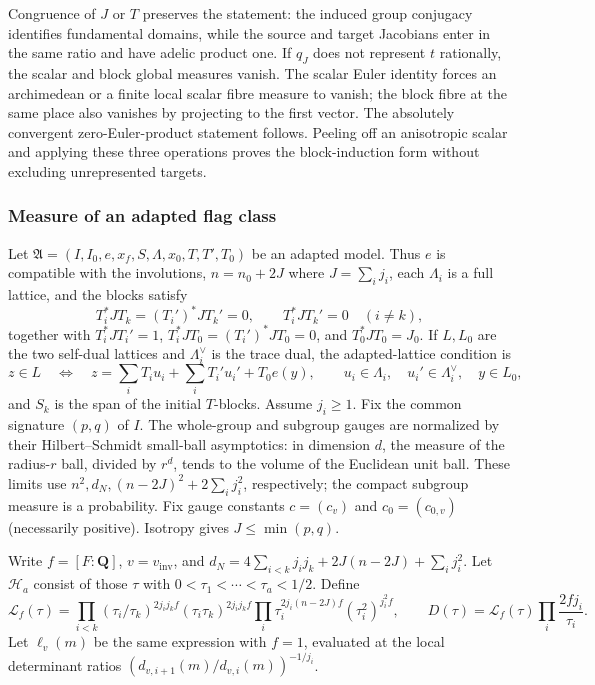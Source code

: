 Congruence of $J$ or $T$ preserves the statement: the induced group conjugacy identifies fundamental domains, while the source and target Jacobians enter in the same ratio and have adelic product one. If $q_J$ does not represent $t$ rationally, the scalar and block global measures vanish. The scalar Euler identity forces an archimedean or a finite local scalar fibre measure to vanish; the block fibre at the same place also vanishes by projecting to the first vector. The absolutely convergent zero-Euler-product statement follows. Peeling off an anisotropic scalar and applying these three operations proves the block-induction form without excluding unrepresented targets.

\subsubsection{Measure of an adapted flag class}

Let $\mathfrak A=(I,I_0,e,x_f,S,\Lambda,x_0,T,T',T_0)$ be an adapted
model. Thus $e$ is compatible with the involutions, $n=n_0+2J$ where
$J=\sum_i j_i$, each $\Lambda_i$ is a full lattice, and the blocks
satisfy
\[
 T_i^*JT_k=(T_i')^*JT_k'=0,\qquad T_i^*JT_k'=0\quad(i\ne k),
\]
together with $T_i^*JT_i'=1$, $T_i^*JT_0=(T_i')^*JT_0=0$, and
$T_0^*JT_0=J_0$. If $L,L_0$ are the two self-dual lattices and
$\Lambda_i^\vee$ is the trace dual, the adapted-lattice condition is
\[
 z\in L\quad\Longleftrightarrow\quad
 z=\sum_iT_iu_i+\sum_iT_i'u_i'+T_0e(y),\qquad
 u_i\in\Lambda_i,\quad u_i'\in\Lambda_i^\vee,\quad y\in L_0,
\]
and $S_k$ is the span of the initial $T$-blocks. Assume $j_i\ge1$.
Fix the common signature $(p,q)$ of $I$. The whole-group and subgroup
gauges are normalized by their Hilbert--Schmidt small-ball asymptotics:
in dimension $d$, the measure of the radius-$r$ ball, divided by $r^d$,
tends to the volume of the Euclidean unit ball. These limits use
$n^2,d_N,(n-2J)^2+2\sum_ij_i^2$, respectively; the compact subgroup
measure is a probability. Fix gauge constants $c=(c_v)$ and
$c_0=(c_{0,v})$ (necessarily positive). Isotropy gives $J\le\min(p,q)$.

Write $f=[F:\mathbf Q]$, $v=v_{\mathrm{inv}}$, and
$d_N=4\sum_{i<k}j_ij_k+2J(n-2J)+\sum_i j_i^2$. Let
$\mathcal H_a$ consist of those $\tau$ with
$0<\tau_1<\cdots<\tau_a<1/2$. Define
\[
 \mathcal L_f(\tau)=
 \prod_{i<k}(\tau_i/\tau_k)^{2j_ij_kf}
                (\tau_i\tau_k)^{2j_ij_kf}
 \prod_i\tau_i^{2j_i(n-2J)f}(\tau_i^2)^{j_i^2f},
 \qquad
 D(\tau)=\mathcal L_f(\tau)\prod_i\frac{2fj_i}{\tau_i}.
\]
Let $\ell_v(m)$ be the same expression with $f=1$, evaluated at the
local determinant ratios
$(d_{v,i+1}(m)/d_{v,i}(m))^{-1/j_i}$.

